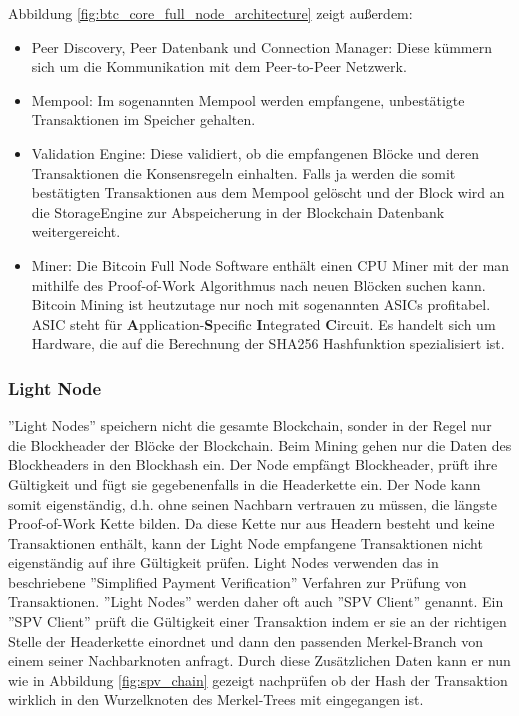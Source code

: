 Abbildung \ref{fig:btc_core_full_node_architecture} zeigt außerdem: 
\begin{itemize}
\item Peer Discovery, Peer Datenbank und Connection Manager: Diese kümmern sich um die Kommunikation mit dem Peer-to-Peer Netzwerk.
\item Mempool: Im sogenannten Mempool werden empfangene, unbestätigte Transaktionen im Speicher gehalten.
\item Validation Engine: Diese validiert, ob die empfangenen Blöcke und deren Transaktionen die Konsensregeln einhalten. Falls ja werden die somit bestätigten Transaktionen aus dem Mempool gelöscht und der Block wird an die StorageEngine zur Abspeicherung in der Blockchain Datenbank weitergereicht.
\item Miner: Die Bitcoin Full Node Software enthält einen CPU Miner mit der man mithilfe des Proof-of-Work Algorithmus nach neuen Blöcken suchen kann. Bitcoin Mining ist heutzutage nur noch mit sogenannten ASICs profitabel. ASIC steht für \textbf{A}pplication-\textbf{S}pecific \textbf{I}ntegrated \textbf{C}ircuit. Es handelt sich um Hardware, die auf die Berechnung der SHA256 Hashfunktion spezialisiert ist.
\end{itemize}


\subsubsection{Light Node}
''Light Nodes'' speichern nicht die gesamte Blockchain, sonder in der Regel nur die Blockheader der Blöcke der Blockchain. Beim Mining gehen nur die Daten des Blockheaders in den Blockhash ein. Der Node empfängt Blockheader, prüft ihre Gültigkeit und fügt sie gegebenenfalls in die Headerkette ein. Der Node kann somit eigenständig, d.h. ohne seinen Nachbarn vertrauen zu müssen, die längste Proof-of-Work Kette bilden. Da diese Kette nur aus Headern besteht und keine Transaktionen enthält, kann der Light Node empfangene Transaktionen nicht eigenständig auf ihre Gültigkeit prüfen. Light Nodes verwenden das in \cite{bitcoin_white_paper} beschriebene ''Simplified Payment Verification'' Verfahren zur Prüfung von Transaktionen. ''Light Nodes'' werden daher oft auch ''SPV Client'' genannt. Ein ''SPV Client'' prüft die Gültigkeit einer Transaktion indem er sie an der richtigen Stelle der Headerkette einordnet und dann den passenden Merkel-Branch von einem seiner Nachbarknoten anfragt. Durch diese Zusätzlichen Daten kann er nun wie in Abbildung \ref{fig:spv_chain}\citep{ethereum_white_paper} gezeigt nachprüfen ob der Hash der Transaktion wirklich in den Wurzelknoten des Merkel-Trees mit eingegangen ist.

